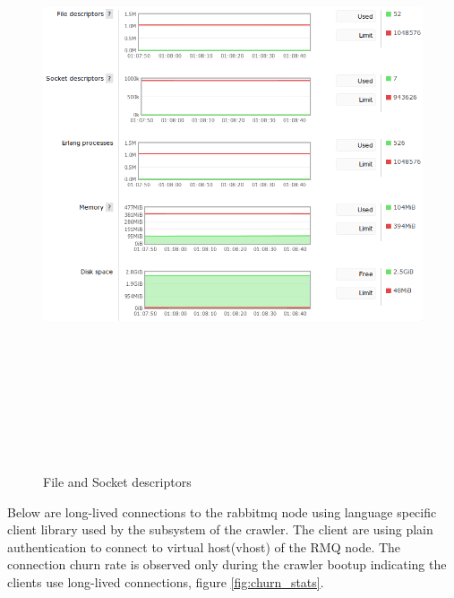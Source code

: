 \begin{figure}[h!]
  \centering
  \includegraphics[width=14cm,height=18cm,keepaspectratio]{../media/crawler/process_stats.png}
  \caption{File and Socket descriptors}
  \label{fig:process_stats}
\end{figure}

\pagebreak

\noindent
Below are long-lived connections to the rabbitmq node using language specific client
library used by the subsystem of the crawler. The client are using plain authentication to connect to virtual host(vhost) of the RMQ node. The connection churn rate
is observed only during the crawler bootup indicating the clients use long-lived
connections, figure \ref{fig:churn_stats}.

